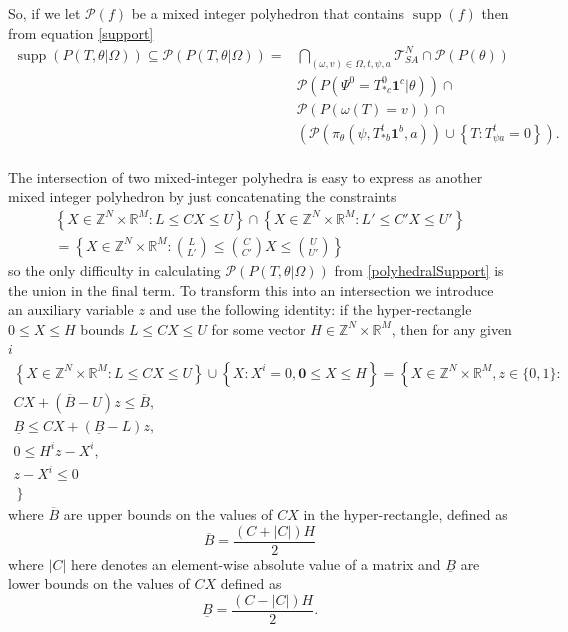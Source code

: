 \documentclass{article}
\DeclareMathOperator\supp{supp}
\begin{document}
So, if we let $\mathcal{P}(f)$ be a mixed integer polyhedron that contains $\supp(f)$ then from equation \eqref{support}
\begin{equation}
\begin{aligned}
\supp(P( T, \theta |\Omega)) \subseteq \mathcal{P}(P(T,\theta|\Omega)) =
& \bigcap_{(\omega,v) \in \Omega,t,\psi, a} \mathcal{T}^N_{SA} \cap \mathcal{P}(P(\theta)) \\
& \mathcal{P}(P(\Psi^0 = T^0_{* c}\mathbf{1}^c|\theta)) \cap\\
&    \mathcal{P}\left(P\left(\omega(T)=v\right)\right) \cap \\
& 
\left(\mathcal{P}\left(\pi_\theta(\psi,T^t_{* b}\mathbf{1}^b,a)\right)
\cup
\left\{T: T^t_{\psi a} = 0\right\}\right).
\\
\end{aligned}
\label{polyhedralSupport}
\end{equation}

The intersection of two mixed-integer polyhedra is easy to express as another mixed integer polyhedron by just concatenating the constraints
\begin{multline}
\left\{ X\in\mathbb{Z}^N \times \mathbb{R}^M : L \le  CX \le U \right\}
\cap
\left\{ X\in\mathbb{Z}^{N} \times \mathbb{R}^{M} : L' \le  C'X \le U' \right\}\\
= \left\{ X\in\mathbb{Z}^{N} \times \mathbb{R}^{M} : {L \choose L'}  \le   {C \choose C'}X \le {U \choose U'} \right\}
\label{intersection}
\end{multline}
so the only difficulty in calculating $\mathcal{P}(P(T,\theta|\Omega))$ from \eqref{polyhedralSupport} is the union in the final term. To transform this into an intersection we introduce an auxiliary variable $z$ and use the following identity: if the hyper-rectangle $0 \le X \le H$ bounds $L \le C X \le U$ for some vector $H \in \mathbb{Z}^N \times \mathbb{R}^M$, then for any given $i$ 
\begin{multline}
\left\{ X\in\mathbb{Z}^N \times \mathbb{R}^M : L \le C X \le U \right\}
\cup
\left\{X: X^i = 0, \mathbf{0} \le X \le H\right\}
= \left\{ \right.X\in\mathbb{Z}^N \times \mathbb{R}^M, z\in\{0,1\}:\\
CX + (\overline{B}-U)z \le \overline{B},\\
\underline{B} \le CX + (\underline{B}-L)z,\\
0 \le H^iz - X^i,\\
 z - X^i \le 0\\
\left. \right\}
\label{implication}
\end{multline}
where $\overline{B}$ are upper bounds on the values of $CX$ in the hyper-rectangle, defined as
\[
\overline{B} = \frac{\left(C+\left|C\right|\right)H}{2}
\]
where $|C|$ here denotes an element-wise absolute value of a matrix and $\underline{B}$ are lower bounds on the values of $CX$ defined as
\[
\underline{B} = \frac{\left(C - \left|C\right|\right)H}{2}.
\]
\end{document}
